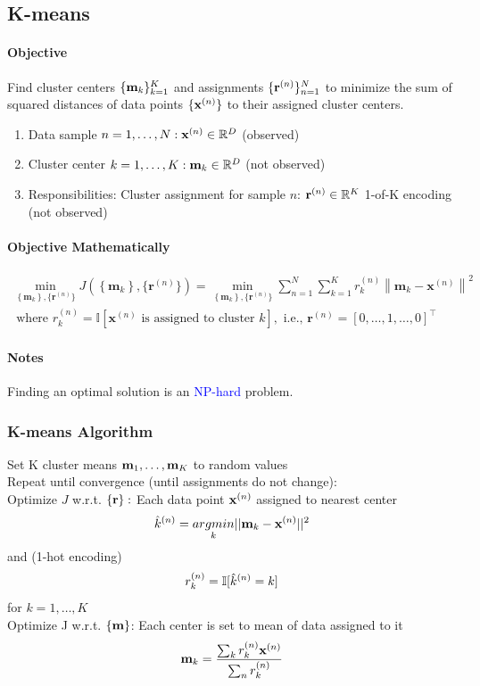 \documentclass[11pt]{article}
\begin{document}
\subsection{K-means}
\paragraph{Objective}
Find cluster centers $\{\textbf{m}_k\}_{k=1}^K$ and assignments $\{\textbf{r}^{(n)}\}_{n=1}^N$ to minimize the sum of squared distances of data points $\{\textbf{x}^{(n)}\}$ to their assigned cluster centers.
\begin{enumerate}
	\item Data sample $n = 1, \hdots, N: \textbf{x}^{(n)} \in \mathbb{R}^D$ (observed)
	\item Cluster center $k = 1, \hdots, K: \textbf{m}_k \in \mathbb{R}^D$ (not observed)
	\item Responsibilities: Cluster assignment for sample $n$: $\textbf{r}^{(n)} \in \mathbb{R}^K$ 1-of-K encoding (not observed)
\end{enumerate}
\paragraph{Objective Mathematically}
$$\begin{array}{l}{\min _{\left\{\mathbf{m}_{k}\right\},\{\mathbf{r}^{(n)}\}} J\left(\left\{\mathbf{m}_{k}\right\},\{\mathbf{r}^{(n)}\}\right)=\min _{\left\{\mathbf{m}_{k}\right\},\{\mathbf{r}^{(n)}\}} \sum_{n=1}^{N} \sum_{k=1}^{K} r_{k}^{(n)}\left\|\mathbf{m}_{k}-\mathbf{x}^{(n)}\right\|^{2}} \\ {\text { where } r_{k}^{(n)}=\mathbb{I}\left[\mathbf{x}^{(n)} \text { is assigned to cluster } k\right], \text { i.e., } \mathbf{r}^{(n)}=[0, \ldots, 1, \ldots, 0]^{\top}}\end{array}$$

\paragraph{Notes}
Finding an optimal solution is an \textcolor{blue}{NP-hard} problem.
    
\subsubsection{K-means Algorithm}
 Set K cluster means $\textbf{m}_1, \hdots, \textbf{m}_K$ to random values \\
Repeat until convergence (until assignments do not change): \\
 Optimize $J$ w.r.t. $\{\textbf{r}\}:$ Each data point $\textbf{x}^{(n)}$ assigned to nearest center
$$\hat{k}^{(n)} = \underset{k}{argmin} ||\textbf{m}_k - \textbf{x}^{(n)}||^2$$
and  (1-hot encoding) 
$$r_k^{(n)} = \mathbb{I}[\hat{k}^{(n)} = k]$$ for $k = 1,\hdots,K$\\
 Optimize J w.r.t. $\{\textbf{m}\}$: Each center is set to mean of data assigned to it 
$$\textbf{m}_k = \frac{\sum_k r_k^{(n)}\textbf{x}^{(n)}}{\sum_n r_k^{(n)}}$$
\end{document}
